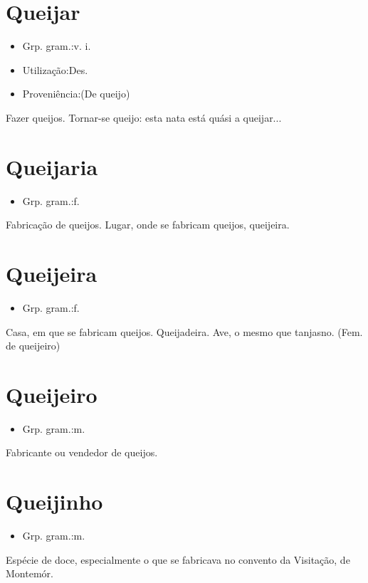 \section{Queijar}
\begin{itemize}
\item {Grp. gram.:v. i.}
\end{itemize}
\begin{itemize}
\item {Utilização:Des.}
\end{itemize}
\begin{itemize}
\item {Proveniência:(De \textunderscore queijo\textunderscore )}
\end{itemize}
Fazer queijos.
Tornar-se queijo: \textunderscore esta nata está quási a queijar...\textunderscore 
\section{Queijaria}
\begin{itemize}
\item {Grp. gram.:f.}
\end{itemize}
Fabricação de queijos.
Lugar, onde se fabricam queijos, queijeira.
\section{Queijeira}
\begin{itemize}
\item {Grp. gram.:f.}
\end{itemize}
Casa, em que se fabricam queijos.
Queijadeira.
Ave, o mesmo que \textunderscore tanjasno\textunderscore .
(Fem. de \textunderscore queijeiro\textunderscore )
\section{Queijeiro}
\begin{itemize}
\item {Grp. gram.:m.}
\end{itemize}
Fabricante ou vendedor de queijos.
\section{Queijinho}
\begin{itemize}
\item {Grp. gram.:m.}
\end{itemize}
Espécie de doce, especialmente o que se fabricava no convento da Visitação, de Montemór.
